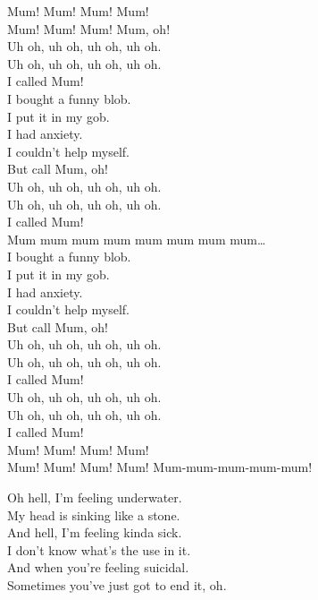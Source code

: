 

Mum! Mum! Mum! Mum! \\
Mum! Mum! Mum! Mum, oh! \\

Uh oh, uh oh, uh oh, uh oh. \\
Uh oh, uh oh, uh oh, uh oh. \\
I called Mum! \\

I bought a funny blob. \\
I put it in my gob. \\
I had anxiety. \\
I couldn't help myself. \\
But call Mum, oh! \\

Uh oh, uh oh, uh oh, uh oh. \\
Uh oh, uh oh, uh oh, uh oh. \\
I called Mum! \\

Mum mum mum mum mum mum mum mum… \\

I bought a funny blob. \\
I put it in my gob. \\
I had anxiety. \\
I couldn't help myself. \\
But call Mum, oh! \\

Uh oh, uh oh, uh oh, uh oh. \\
Uh oh, uh oh, uh oh, uh oh. \\
I called Mum! \\

Uh oh, uh oh, uh oh, uh oh. \\
Uh oh, uh oh, uh oh, uh oh. \\
I called Mum! \\

Mum! Mum! Mum! Mum! \\
Mum! Mum! Mum! Mum! Mum-mum-mum-mum-mum! \\




Oh hell, I'm feeling underwater. \\
My head is sinking like a stone. \\
And hell, I'm feeling kinda sick. \\
I don't know what's the use in it. \\
And when you're feeling suicidal. \\
Sometimes you've just got to end it, oh. \\

